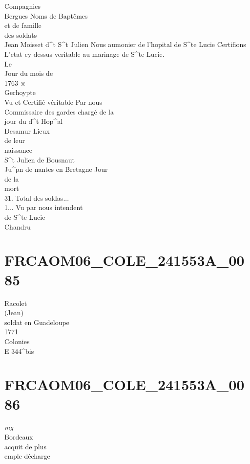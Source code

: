 \documentclass{article}
\begin{document}
\begin{pages}
Compagnies\\
Bergues
\pend\pstart
Noms de Baptêmes\\
et de famille\\
des soldats\\
Jean Moisset d\^{}t S\^{}t Julien
\pend\pstart
Nous aumonier de l'hopital de S\^{}te Lucie Certifions\\
L'etat cy dessus veritable au marinage de S\^{}te Lucie.\\
Le\\
Jour du mois de\\
1763 ※\\
Gerhoypte\\
Vu et Certifié véritable Par nous\\
Commissaire des gardes chargé de la\\
jour du d\^{}t Hop\^{}al\\
Desamur
\pend\pstart
Lieux\\
de leur\\
naissance\\
S\^{}t Julien de Bousnaut\\
Ju\^{}pn de nantes en Bretagne
\pend\pstart
Jour\\
de la\\
mort\\
31.
\pend\pstart
Total des soldas...\\
1...
\pend\pstart
Vu par nous intendent\\
de S\^{}te Lucie\\
Chandru
\pend
\endnumbering\beginnumbering\section{FRCAOM06\_COLE\_241553A\_0085}\pstart
Racolet\\
(Jean)\\
soldat en Guadeloupe\\
1771\\
Colonies\\
E 344\^{}bis
\pend
\endnumbering\beginnumbering\section{FRCAOM06\_COLE\_241553A\_0086}
\vspace{0.5cm}\noindent
\textit{mg}
\footnotesize \\
Bordeaux\\
acquit de plus\\
emple décharge\\

\end{pages}
\end{document}
